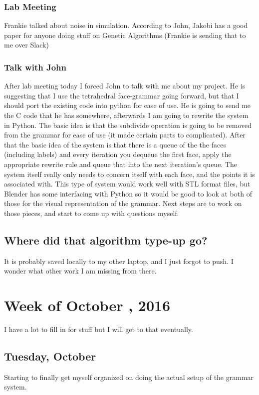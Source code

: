 \documentclass[letterpaper,oneside,titlepage]{article}
\begin{document}
\subsubsection{Lab Meeting}
Frankie talked about noise in simulation.  According to John, Jakobi has a good paper for anyone doing stuff on Genetic Algorithms (Frankie is sending that to me over Slack)
\subsubsection{Talk with John}
After lab meeting today I forced John to talk with me about my project.	 He is suggesting that I use the tetrahedral face-grammar \cite{Rieffel:face-grammar} going forward, but that I should port the existing code into python for ease of use.  He is going to send me the C code that he has somewhere, afterwards I am going to rewrite the system in Python.  The basic idea is that the subdivide operation is going to be removed from the grammar for ease of use (it made certain parts to complicated).  After that the basic idea of the system is that there is a queue of the the faces (including labels) and every iteration you dequeue the first face, apply the appropriate rewrite rule and queue that into the next iteration's queue.  The system itself really only needs to concern itself with each face, and the points it is associated with.  This type of system would work well with STL format files, but Blender has some interfacing with Python so it would be good to look at both of those for the visual representation of the grammar.  Next steps are to work on those pieces, and start to come up with questions myself.

\subsection{Where did that algorithm type-up go?}
It is probably saved locally to my other laptop, and I just forgot to push.  I wonder what other work I am missing from there.


\section{Week of October , 2016}
I have a lot to fill in for stuff but I will get to that eventually.

\subsection{Tuesday, October }
Starting to finally get myself organized on doing the actual setup of the grammar system.
\end{document}
